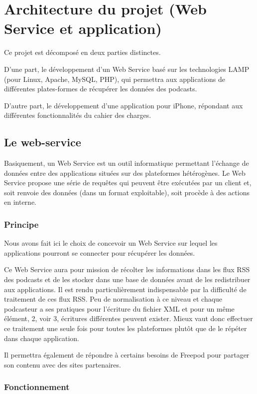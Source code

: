 \documentclass[11pt, french]{report}
\begin{document}
\section{Architecture du projet (Web Service et application)}
Ce projet est décomposé en deux parties distinctes. 

D’une part, le développement d’un Web Service basé sur les technologies LAMP (pour Linux, Apache, MySQL, PHP), qui permettra aux applications de différentes plates-formes de récupérer les données des podcasts. 

D'autre part, le développement d'une application pour iPhone, répondant aux différentes fonctionnalités du cahier des charges.

\subsection{Le web-service}

Basiquement, un Web Service est un outil informatique permettant l'échange de données entre des applications situées sur des plateformes hétérogènes. Le Web Service propose une série de requêtes qui peuvent être exécutées par un client et, soit renvoie des données (dans un format exploitable), soit procède à des actions en interne.

\subsubsection{Principe}

Nous avons fait ici le choix de concevoir un Web Service sur lequel les applications pourront se connecter pour récupérer les données. 

Ce Web Service aura pour mission de récolter les informations dans les flux RSS des podcasts et de les stocker dans une base de données avant de les redistribuer aux applications. Il est rendu particulièrement indispensable par la difficulté de traitement de ces flux RSS. Peu de normalisation à ce niveau et chaque podcasteur a ses pratiques pour l'écriture du fichier XML et pour un même élément, 2, voir 3, écritures différentes peuvent exister. Mieux vaut donc effectuer ce traitement une seule fois pour toutes les plateformes plutôt que de le répéter dans chaque application.

Il permettra également de répondre à certains besoins de Freepod pour partager son contenu avec des sites partenaires.

\subsubsection{Fonctionnement}
\end{document}
